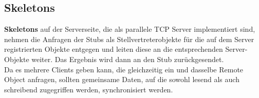 \subsection*{Skeletons}
\textbf{Skeletons} auf der Serverseite, die als parallele TCP Server implementiert sind, nehmen die Anfragen der Stubs als Stellvertreterobjekte für die auf dem Server registrierten Objekte entgegen und leiten diese an die entsprechenden Server-Objekte weiter.
Das Ergebnis wird dann an den Stub zurückgesendet.\\


\noindent
Da es mehrere Clients geben kann, die gleichzeitig ein und dasselbe Remote Object anfragen, sollten gemeinsame Daten, auf die sowohl lesend als auch schreibend zugegriffen werden, synchronisiert werden.
